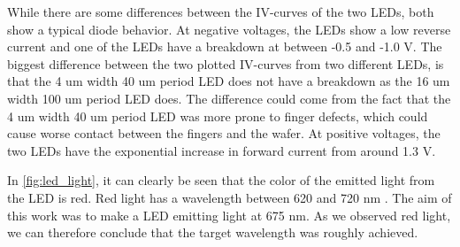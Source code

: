 While there are some differences between the IV-curves of the two LEDs, both show a typical diode behavior.
At negative voltages, the LEDs show a low reverse current and one of the LEDs have a breakdown at between -0.5 and -1.0 V.
The biggest difference between the two plotted IV-curves from two different LEDs, is that the 4 um width 40 um period LED does not have a breakdown as the 16 um width 100 um period LED does.
The difference could come from the fact that the 4 um width 40 um period LED was more prone to finger defects, which could cause worse contact between the fingers and the wafer. 
At positive voltages, the two LEDs have the exponential increase in forward current from around 1.3 V.

In \autoref{fig:led_light}, it can clearly be seen that the color of the emitted light from the LED is red.
Red light has a wavelength between 620 and 720 nm \cite{red_light}.
The aim of this work was to make a LED emitting light at 675 nm.
As we observed red light, we can therefore conclude that the target wavelength was roughly achieved.
